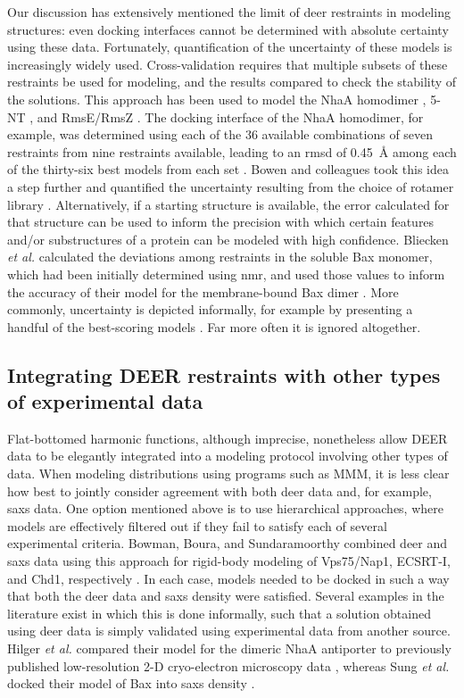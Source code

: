 Our discussion has extensively mentioned the limit of \gls{deer} restraints in modeling structures: even docking interfaces cannot be determined with absolute certainty using these data. Fortunately, quantification of the uncertainty of these models is increasingly widely used. Cross-validation requires that multiple subsets of these restraints be used for modeling, and the results compared to check the stability of the solutions. This approach has been used to model the NhaA homodimer \citep*{Hilger2007}, 5-NT \citep*{Krug2016}, and RmsE/RmsZ \citep*{Bhatnagar2007}. The docking interface of the NhaA homodimer, for example, was determined using each of the 36 available combinations of seven restraints from nine restraints available, leading to an \gls{rmsd} of \SI{0.45}{\angstrom} among each of the thirty-six best models from each set \citep*{Hilger2007}. Bowen and colleagues took this idea a step further and quantified the uncertainty resulting from the choice of rotamer library \citep*{Bowen2018}. Alternatively, if a starting structure is available, the error calculated for that structure can be used to inform the precision with which certain features and/or substructures of a protein can be modeled with high confidence. Bliecken \emph{et al.} calculated the deviations among restraints in the soluble Bax monomer, which had been initially determined using \gls{nmr}, and used those values to inform the accuracy of their model for the membrane-bound Bax dimer \citep*{Bleicken2014}. More commonly, uncertainty is depicted informally, for example by presenting a handful of the best-scoring models \citep*{Evans2020, Gigli2018, Kim2011}. Far more often it is ignored altogether.

\subsection{Integrating DEER restraints with other types of experimental data}

Flat-bottomed harmonic functions, although imprecise, nonetheless allow DEER data to be elegantly integrated into a modeling protocol involving other types of data. When modeling distributions using programs such as MMM, it is less clear how best to jointly consider agreement with both \gls{deer} data and, for example, \gls{saxs} data. One option mentioned above is to use hierarchical approaches, where models are effectively filtered out if they fail to satisfy each of several experimental criteria. Bowman, Boura, and Sundaramoorthy combined \gls{deer} and \gls{saxs} data using this approach for rigid-body modeling of Vps75/Nap1, ECSRT-I, and Chd1, respectively \citep*{Boura2012, Boura2011, Bowen2018, Sundaramoorthy2017}. In each case, models needed to be docked in such a way that both the \gls{deer} data and \gls{saxs} density were satisfied. Several examples in the literature exist in which this is done informally, such that a solution obtained using \gls{deer} data is simply validated using experimental data from another source. Hilger \emph{et al.} compared their model for the dimeric NhaA antiporter to previously published low-resolution 2-D cryo-electron microscopy data \citep*{Hilger2007}, whereas Sung \emph{et al.} docked their model of Bax into \gls{saxs} density \citep*{Sung2015}.

